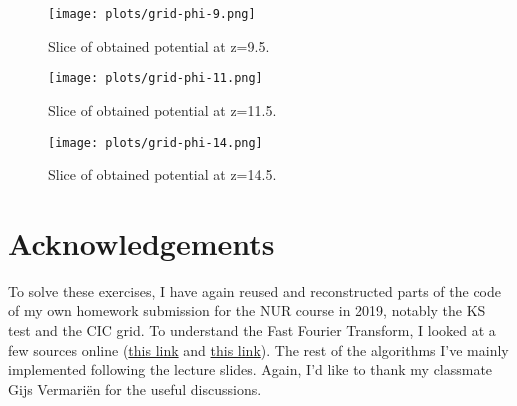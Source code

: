 \documentclass{article}
\begin{document}
\begin{figure}
    \centering
    \texttt{[image: plots/grid-phi-9.png]}
    \caption{Slice of obtained potential at z=9.5.}
    \label{fig:my_label}
\end{figure}

\begin{figure}
    \centering
    \texttt{[image: plots/grid-phi-11.png]}
    \caption{Slice of obtained potential at z=11.5.}
    \label{fig:my_label}
\end{figure}

\begin{figure}
    \centering
    \texttt{[image: plots/grid-phi-14.png]}
    \caption{Slice of obtained potential at z=14.5.}
    \label{fig:my_label}
\end{figure}

\section*{Acknowledgements}
To solve these exercises, I have again reused and reconstructed parts of the code of my own homework submission for the NUR course in 2019, notably the KS test and the CIC grid. To understand the Fast Fourier Transform, I looked at a few sources online (\href{https://www.algorithm-archive.org/contents/cooley_tukey/cooley_tukey.html}{this link} and \href{https://jakevdp.github.io/blog/2013/08/28/understanding-the-fft/}{this link}). The rest of the algorithms I've mainly implemented following the lecture slides. Again, I'd like to thank my classmate Gijs Vermari\"en for the useful discussions.
\end{document}
